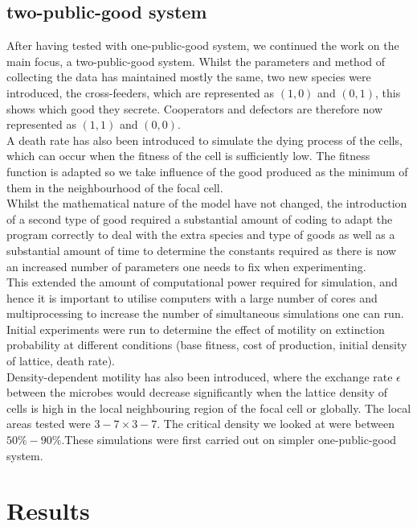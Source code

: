 \documentclass[11pt]{article}
\begin{document}
\subsection{two-public-good system}
After having tested with one-public-good system, we continued the work on the main focus, a two-public-good system. Whilst the parameters and method of collecting the data has maintained mostly the same, two new species were introduced, the cross-feeders, which are represented as $(1,0)$ and $(0,1)$, this shows which good they secrete. Cooperators and defectors are therefore now represented as $(1,1)$ and $(0,0)$.\\
A death rate has also been introduced to simulate the dying process of the cells, which can occur when the fitness of the cell is sufficiently low. The fitness function is adapted so we take influence of the good produced as the minimum of them in the neighbourhood of the focal cell.\\
Whilst the mathematical nature of the model have not changed, the introduction of a second type of good required a substantial amount of coding to adapt the program correctly to deal with the extra species and type of goods as well as a substantial amount of time to determine the constants required as there is now an increased number of parameters one needs to fix when experimenting.\\
This extended the amount of computational power required for simulation, and hence it is important to utilise computers with a large number of cores and multiprocessing to increase the number of simultaneous simulations one can run.\\
Initial experiments were run to determine the effect of motility on extinction probability at different conditions (base fitness, cost of production, initial density of lattice, death rate).\\
Density-dependent motility has also been introduced, where the exchange rate $\epsilon$ between the microbes would decrease significantly when the lattice density of cells is high in the local neighbouring region of the focal cell or globally. The local areas tested were $ 3-7 \times 3-7$. The critical density we looked at were between $50\%-90\%$.These simulations were first carried out on simpler one-public-good system.

\section{Results}
\end{document}
